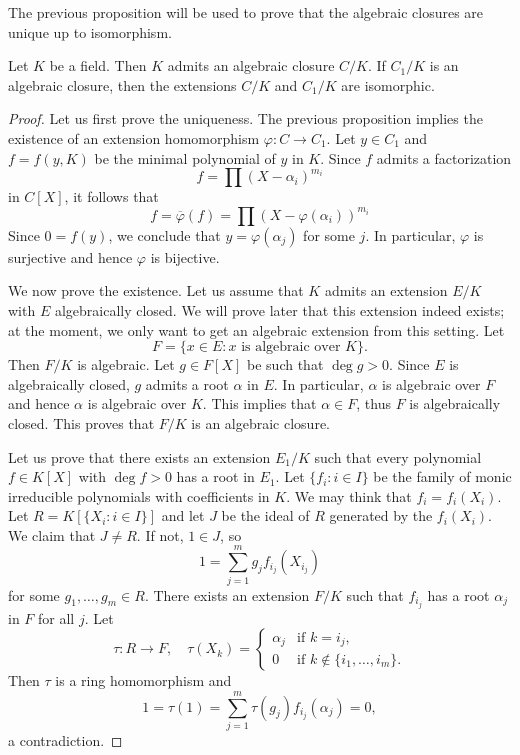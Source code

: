
The previous proposition will be used to prove 
that the algebraic closures are unique up to isomorphism. 

\begin{theorem}[Artin]\label{thm:Artin}
	Let $K$ be a field. Then $K$ admits an algebraic closure $C/K$. If $C_1/K$
	is an algebraic closure, then the extensions $C/K$ and $C_1/K$ are
	isomorphic. 
\end{theorem}

\begin{proof}
    Let us first prove the uniqueness. The previous proposition implies the existence of 
    an extension homomorphism $\varphi\colon C\to C_1$. Let $y\in C_1$ and $f=f(y,K)$ be 
    the minimal polynomial of $y$ in $K$. Since $f$ admits a factorization
    \[
        f=\prod (X-\alpha_i)^{m_i}
    \]
    in $C[X]$, it follows that
    \[
    f=\overline{\varphi}(f)=\prod (X-\varphi(\alpha_i))^{m_i}
    \]
    Since $0=f(y)$, we conclude that $y=\varphi(\alpha_j)$ for some $j$. In particular, $\varphi$ is
    surjective and hence $\varphi$ is bijective. 
    
    We now prove the existence. Let us assume that $K$ admits an extension $E/K$ 
    with $E$ algebraically closed. We will prove later that this extension indeed exists; at the moment,
    we only want to get an algebraic extension from this setting. Let 
    \[
    	F=\{x\in E:x\text{ is algebraic over }K\}. 
    \]
    Then $F/K$ is algebraic. Let $g\in F[X]$ be such that
    $\deg g>0$. Since $E$ is algebraically closed, $g$ admits a root $\alpha$ in $E$. In particular, $\alpha$
    is algebraic over $F$ and hence $\alpha$ is algebraic over $K$. This implies that $\alpha\in F$, thus
    $F$ is algebraically closed. This proves that $F/K$ is an algebraic closure. 
    
    Let us prove that there exists an extension $E_1/K$ such that
    every polynomial $f\in K[X]$ with $\deg f>0$ has a root in $E_1$. Let 
    $\{f_i:i\in I\}$ be the family of monic irreducible polynomials with coefficients in $K$. 
    We may think that $f_i=f_i(X_i)$. 
    Let $R=K[\{X_i:i\in I\}]$ and let $J$ be the ideal of $R$ 
    generated by the $f_i(X_i)$. We claim that $J\ne R$. If not, $1\in J$, so
    \[
    1=\sum_{j=1}^m g_jf_{i_j}(X_{i_j})
    \]
    for some $g_1,\dots,g_m\in R$. There exists an extension $F/K$ such that
    $f_{i_j}$ has a root $\alpha_j$ in $F$ for all $j$. Let 
    \[
    \tau\colon R\to F,\quad
    \tau(X_k)=\begin{cases}
        \alpha_j & \text{if $k=i_j$},\\
        0 & \text{if $k\not\in\{i_1,\dots,i_m\}$}.
        \end{cases}
    \]
    Then $\tau$ is a ring homomorphism and 
    \[
    1=\tau(1)=\sum_{j=1}^m\tau(g_j)f_{i_j}(\alpha_{j})=0,
    \]
    a contradiction. 
    

\end{proof}
